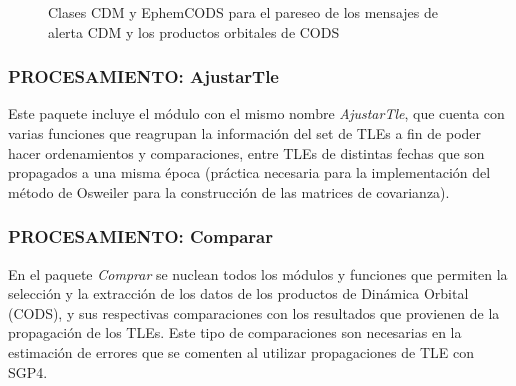 \begin{figure}[!h]
\centering
  \hspace{1.5cm}
  \caption[Clases CDM y EphemCODS]{Clases CDM y EphemCODS para el pareseo de los mensajes de alerta CDM y los productos orbitales de \ac{CODS}}
\end{figure}

\subsubsection*{PROCESAMIENTO: AjustarTle}
Este paquete incluye el m\'odulo con el mismo nombre {\it{AjustarTle}}, que cuenta con varias funciones que reagrupan la informaci\'on del set de TLEs a fin de poder hacer ordenamientos y comparaciones, entre TLEs de distintas fechas que son propagados a una misma \'epoca (pr\'actica necesaria para la implementaci\'on del m\'etodo de Osweiler para la construcci\'on de las matrices de covarianza).\\

\subsubsection*{PROCESAMIENTO: Comparar}
En el paquete {\it{Comprar}} se nuclean todos los m\'odulos y funciones que permiten la selecci\'on y la extracci\'on de los datos de los productos de Din\'amica Orbital (CODS), y sus respectivas comparaciones con los resultados que provienen de la propagaci\'on de los TLEs. Este tipo de comparaciones son necesarias en la estimaci\'on de errores que se comenten al utilizar propagaciones de TLE con SGP4. 

